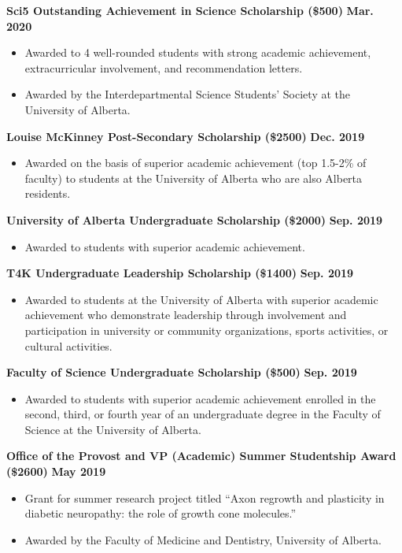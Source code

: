 \documentclass{article}
\begin{document}
\textbf{Sci5 Outstanding Achievement in Science Scholarship (\$500)} \hfill \textbf{Mar. 2020}
\begin{itemize}
    \item Awarded to 4 well-rounded students with strong academic achievement, extracurricular involvement, and recommendation letters.
    \item Awarded by the Interdepartmental Science Students' Society at the University of Alberta.
\end{itemize}
    \textbf{Louise McKinney Post-Secondary Scholarship (\$2500)} \hfill \textbf{Dec. 2019}
        \begin{itemize}
            \item Awarded on the basis of superior academic achievement (top 1.5-2\% of faculty) to students at the University of Alberta who are also Alberta residents.
        \end{itemize}
    \textbf{University of Alberta Undergraduate Scholarship (\$2000)} \hfill \textbf{Sep. 2019}
        \begin{itemize}
            \item Awarded to students with superior academic achievement.
        \end{itemize}
    \textbf{T4K Undergraduate Leadership Scholarship (\$1400)} \hfill \textbf{Sep. 2019}
        \begin{itemize}
            \item Awarded to students at the University of Alberta with superior academic achievement who demonstrate leadership through involvement and participation in university or community organizations, sports activities, or cultural activities.
        \end{itemize}
    \textbf{Faculty of Science Undergraduate Scholarship (\$500)} \hfill \textbf{Sep. 2019}
        \begin{itemize}
            \item Awarded to students with superior academic achievement enrolled in the second, third, or fourth year of an undergraduate degree in the Faculty of Science at the University of Alberta.
        \end{itemize}
    \textbf{Office of the Provost and VP (Academic) Summer Studentship Award (\$2600)} \hfill \textbf{May 2019}
        \begin{itemize}
            \item Grant for summer research project titled ``Axon regrowth and plasticity in diabetic neuropathy: the role of growth cone molecules.''
            \item Awarded by the Faculty of Medicine and Dentistry, University of Alberta.
        \end{itemize}
\end{document}
